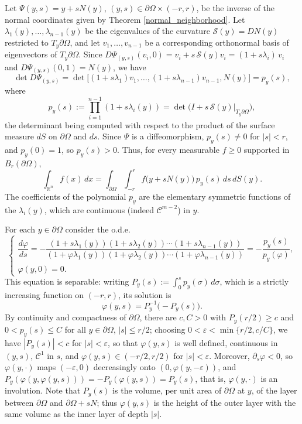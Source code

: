 \documentclass[a4paper,12pt]{amsart}
\renewcommand{\proof}{{\noindent \bf Proof. \ }}
\newcommand{\R}{\mathbb{R}}
\begin{document}
\noindent \proof
{Let $\Psi(y,s) = y + sN(y)$, $(y,s) \in \partial\Omega\times(-r,r)$, be the inverse of the normal coordinates given by Theorem \ref{normal_neighborhood}.
Let $\lambda_1(y), \dots, \lambda_{n-1}(y)$ be the eigenvalues of the curvature $\mathcal{S}(y) = DN(y)$ restricted to $T_y\partial\Omega$, and let
$v_1, \dots, v_{n-1}$ be a corresponding orthonormal basis of eigenvectors of $T_y\partial\Omega$.
Since $D\Psi_{(y,s)}(v_i,0) = v_i + s\,\mathcal{S}(y) v_i = (1+s\lambda_i)\, v_i$ and $D\Psi_{(y,s)}(0,1) = N(y)$, we have
\[
 \det D\Psi_{(y,s)} = \det\big[(1+s\lambda_1)v_1, \dots, (1+s\lambda_{n-1})v_{n-1}, N(y)\big] = p_y(s),
\]
where
\[ p_y(s) := \prod_{i=1}^{n-1}(1+s\lambda_i(y)) = \det\big(I + s\,\mathcal{S}(y)\big|_{T_y\partial\Omega}\big),\]
the determinant being computed with respect to the product of the surface measure $dS$ on $\partial\Omega$ and $ds$. Since $\Psi$ is a diffeomorphism, $p_y(s) \neq 0$ for $|s| < r$, and $p_y(0) = 1$, so $p_y(s) > 0$. Thus, for every measurable $f \geq 0$ supported in $B_r(\partial\Omega)$,
\begin{equation}\label{normal_coord_integral}
 \int_{\R^n} f(x)\, dx = \int_{\partial\Omega}\int_{-r}^{r} f\big(y + sN(y)\big)\, p_y(s)\, ds\, dS(y).
\end{equation}
The coefficients of the polynomial $p_y$ are the elementary symmetric functions of the $\lambda_i(y)$, which are continuous (indeed $\mathcal{C}^{m-2}$) in $y$.}

{For each $y \in \partial\Omega$ consider the o.d.e.}
\begin{equation}
 \label{diff_equation} \begin{cases}
 \dfrac{d\varphi}{ds} = -\dfrac{(1+ s \lambda_1(y))(1+ s \lambda_2(y))
 \cdots(1+ s \lambda_{n-1}(y))}{(1+ \varphi \lambda_1(y))(1+ \varphi \lambda_2(y))
 \cdots(1+ \varphi \lambda_{n-1}(y))} {= -\dfrac{p_y(s)}{p_y(\varphi)}},\\[2mm]
 \varphi(y,0) = 0.
\end{cases} \end{equation}
{This equation is separable: writing $P_y(s) := \int_0^s p_y(\sigma)\, d\sigma$, which is a strictly increasing function on $(-r,r)$, its solution is
\[ \varphi(y,s) = P_y^{-1}\big(-P_y(s)\big). \]
By continuity and compactness of $\partial\Omega$, there are $c, C > 0$ with $P_y(r/2) \geq c$ and $0 < p_y(s) \leq C$ for all $y \in \partial\Omega$, $|s| \leq r/2$; choosing $0 < \varepsilon < \min\{r/2, c/C\}$, we have $|P_y(s)| < c$ for $|s| < \varepsilon$, so that $\varphi(y,s)$ is well defined, continuous in $(y,s)$, $\mathcal{C}^1$ in $s$, and $\varphi(y,s) \in (-r/2,r/2)$ for $|s| < \varepsilon$.
Moreover, $\partial_s\varphi < 0$, so $\varphi(y,\cdot)$ maps $(-\varepsilon, 0)$ decreasingly onto $(0, \varphi(y,-\varepsilon))$, and $P_y(\varphi(y,\varphi(y,s))) = -P_y(\varphi(y,s)) = P_y(s)$, that is, $\varphi(y,\cdot)$ is an involution.
Note that $P_y(s)$ is the volume, per unit area of $\partial\Omega$ at $y$, of the layer between $\partial \Omega$ and $\partial\Omega + sN$; thus $\varphi(y,s)$ is the height of the outer layer with the same volume as the inner layer of depth $|s|$.}
\end{document}

